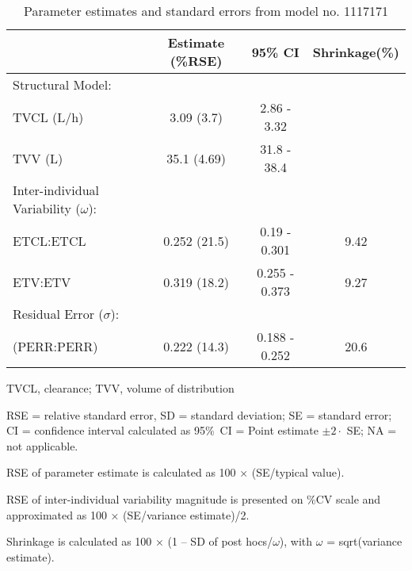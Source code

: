 \begin{table}[ht]
\begin{threeparttable}
\centering
\caption{Parameter estimates and standard errors from model no. 1117171} 
\label{tab:paramsum1117171}
\begingroup\small
\begin{tabular}{lccc}
  \hline
 & Estimate (\%RSE) & 95\% CI & Shrinkage(\%) \\ 
  \hline
Structural Model: &  &  &  \\ 
  TVCL (L/h)& 3.09 (3.7) & 2.86 - 3.32 &  \\ 
  TVV (L)& 35.1 (4.69) & 31.8 - 38.4 &  \\ 
  Inter-individual Variability ($\omega$): &  &  &  \\ 
  ETCL:ETCL & 0.252 (21.5) & 0.19 - 0.301 & 9.42 \\ 
  ETV:ETV & 0.319 (18.2) & 0.255 - 0.373 & 9.27 \\ 
  Residual Error ($\sigma$): &  &  &  \\ 
   (PERR:PERR) & 0.222 (14.3) & 0.188 - 0.252 & 20.6 \\ 
   \hline
\end{tabular}
\endgroup
\begin{tablenotes}\footnotesize
\item[] TVCL, clearance; TVV, volume of distribution
\item[] RSE = relative standard error, SD = standard deviation; SE = standard error; CI = confidence interval calculated as 95\%~CI = Point estimate $\pm 2 \cdot$ SE; NA = not applicable.
\item[] RSE of parameter estimate is calculated as 100 × (SE/typical value).
\item[] RSE of inter-individual variability magnitude is presented on \%CV scale and approximated as 100 × (SE/variance estimate)/2.
\item[] Shrinkage is calculated as 100 × (1 – SD of post hocs/$\omega$), with $\omega$ = sqrt(variance estimate).
\end{tablenotes}
\end{threeparttable}
\end{table}
